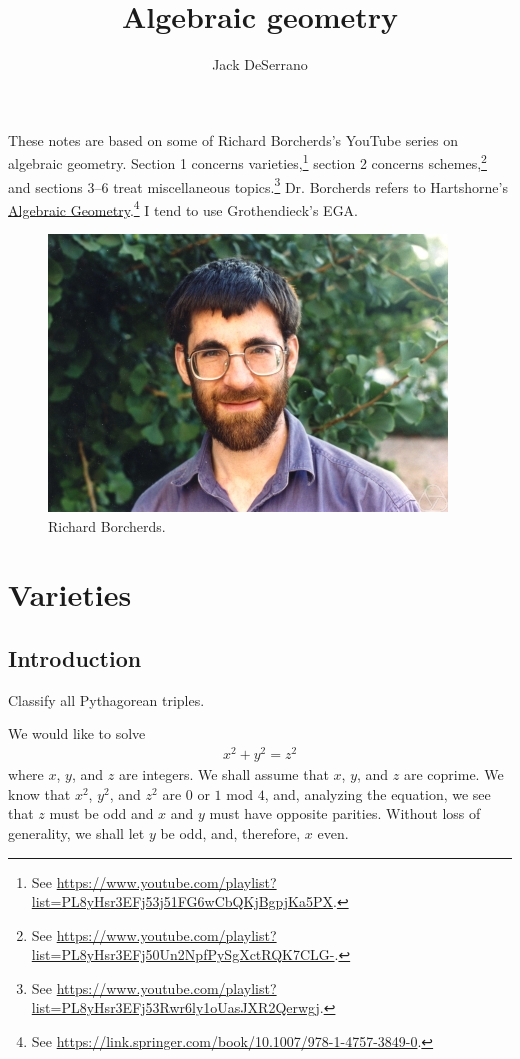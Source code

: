 \documentclass [11 pt, oneside, margin = 1 in] {article}
\title {Algebraic geometry}
\author {Jack DeSerrano}
\begin{document}
\ifams
    \vspace*{\fill}
\fi
\maketitle
These notes are based on some of Richard Borcherds's YouTube series on algebraic geometry. Section 1 concerns varieties,\footnote{See \url{https://www.youtube.com/playlist?list=PL8yHsr3EFj53j51FG6wCbQKjBgpjKa5PX}.} section 2 concerns schemes,\footnote{See \url{https://www.youtube.com/playlist?list=PL8yHsr3EFj50Un2NpfPySgXctRQK7CLG-}.} and sections 3--6 treat miscellaneous topics.\footnote{See \url{https://www.youtube.com/playlist?list=PL8yHsr3EFj53Rwr6ly1oUasJXR2Qerwgj}.} Dr. Borcherds refers to Hartshorne's \underline{Algebraic Geometry}.\footnote{See \url{https://link.springer.com/book/10.1007/978-1-4757-3849-0}.} I tend to use Grothendieck's EGA.
\tableofcontents
\ifams
	\vspace*{\fill}
\fi


\begin{figure}
\begin{center}
\includegraphics[scale=0.8]{images/borcherds}
\caption{Richard Borcherds.}
\end{center}
\end{figure}
\text{}
\newpage


\section{Varieties}

\subsection{Introduction}
\begin{problem}
	Classify all Pythagorean triples.
\end{problem}
We would like to solve
\begin{align*}
	x^2 + y^2 = z^2
\end{align*}
where $x$, $y$, and $z$ are integers. We shall assume that $x$, $y$, and $z$ are coprime. We know that $x^2$, $y^2$, and $z^2$ are $0$ or $1$ mod $4$, and, analyzing the equation, we see that $z$ must be odd and $x$ and $y$ must have opposite parities. Without loss of generality, we shall let $y$ be odd, and, therefore, $x$ even.
\end{document}
